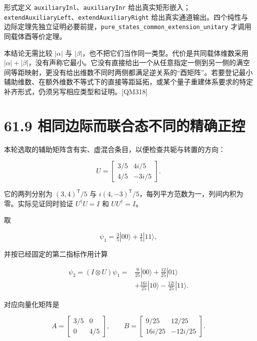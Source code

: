 \documentclass[
  11pt,
  oneside]{book}
\begin{document}
形式定义 \texttt{auxiliaryInl}、\allowbreak \texttt{auxiliaryInr}
给出真实矩形嵌入；\texttt{extendAuxiliaryLeft}、\allowbreak \texttt{extendAuxiliaryRight}
给出真实通道输出。四个纯性与边际定理先独立证明必要前提，\texttt{pure\_\allowbreak states\_\allowbreak common\_\allowbreak extension\_\allowbreak unitary}
才调用同载体酉等价定理。

本结论无需比较 \(|\alpha|\) 与
\(|\beta|\)，也不把它们当作同一类型。代价是共同载体维数采用
\(|\alpha|+|\beta|\)，没有声称它最小。它没有直接给出一个从任意指定一侧到另一侧的满空间等距映射，更没有给出维数不同时两侧都满足逆关系的``酉矩阵''。若要登记最小辅助维数、在额外维数不等式下的直接等距延拓，或某个量子重建体系要求的特定补齐形式，仍须另写相应类型和证明。{[}QM318{]}

\hypertarget{ux76f8ux540cux8fb9ux9645ux800cux8054ux5408ux6001ux4e0dux540cux7684ux7cbeux786eux6b63ux63a7}{%
\section{61.9
相同边际而联合态不同的精确正控}\label{ux76f8ux540cux8fb9ux9645ux800cux8054ux5408ux6001ux4e0dux540cux7684ux7cbeux786eux6b63ux63a7}}

本轮选取的辅助矩阵含有实、虚混合条目，以便检查共轭与转置的方向：

\[
U=\begin{bmatrix}3/5&4i/5\\4/5&-3i/5\end{bmatrix}.
\]

它的两列分别为 \((3,4)^\mathsf T/5\) 与
\(i(4,-3)^\mathsf T/5\)，每列平方范数为一，列间内积为零。实际见证同时验证
\(U^\dagger U=I\) 和 \(UU^\dagger=I\)。

取

\[
\psi_1=\tfrac35|00\rangle+\tfrac45|11\rangle,
\]

并按已经固定的第二指标作用计算

\[
\begin{aligned}
\psi_2=(I\otimes U)\psi_1
={}&\tfrac9{25}|00\rangle+\tfrac{12}{25}|01\rangle\\
&+\tfrac{16i}{25}|10\rangle-\tfrac{12i}{25}|11\rangle.
\end{aligned}
\]

对应向量化矩阵是

\[
A=\begin{bmatrix}3/5&0\\0&4/5\end{bmatrix},
\qquad
B=\begin{bmatrix}9/25&12/25\\16i/25&-12i/25\end{bmatrix}.
\]
\end{document}
